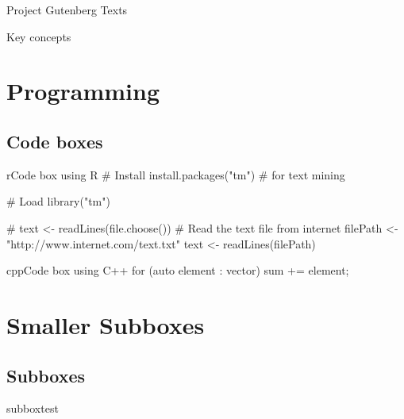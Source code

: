 \documentclass[10pt,a4paper]{article}
\begin{document}
\begin{multicols}{3}
\begin{textbox}{Project Gutenberg Texts}
\end{textbox}





\begin{textbox}{Key concepts}




\end{textbox}


\section{Programming}

\subsection{Code boxes}


\begin{codebox}{r}{Code box using R}
# Install
install.packages("tm")  # for text mining

# Load
library("tm")

# text <- readLines(file.choose())
# Read the text file from internet
filePath <- "http://www.internet.com/text.txt"
text <- readLines(filePath)

\end{codebox}


\begin{codebox}{cpp}{Code box using C++}
for (auto element : vector) 
{
    sum += element;
}
\end{codebox}

\newpage
\section{Smaller Subboxes}
\subsection{Subboxes}
\begin{multibox}{2} %
\begin{subbox}{subbox}{test}
\tiny



\end{subbox}
\end{multibox}
\end{multicols}
\end{document}
